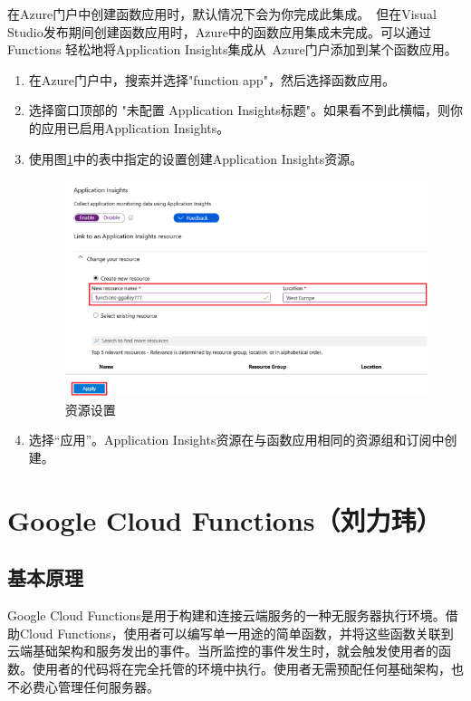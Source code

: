 \documentclass[11pt]{article}
\begin{document}
在Azure门户中创建函数应用时，默认情况下会为你完成此集成。 但在Visual Studio发布期间创建函数应用时，Azure中的函数应用集成未完成。可以通过 Functions 轻松地将Application Insights集成从 Azure门户添加到某个函数应用。
\begin{enumerate}
	\item 在Azure门户中，搜索并选择"function app"，然后选择函数应用。
	\item 选择窗口顶部的 "未配置 Application Insights标题"。如果看不到此横幅，则你的应用已启用Application Insights。
	\item 使用图\ref{fig13}中的表中指定的设置创建Application Insights资源。
	\begin{figure}[h]	
		\centering
		\includegraphics[scale=0.6]{figs/13.png}        %
		\caption{资源设置}
		\label{fig13}	
	\end{figure}
	\item 选择“应用”。Application Insights资源在与函数应用相同的资源组和订阅中创建。
\end{enumerate}	

\section{Google Cloud Functions（刘力玮）}
\subsection{基本原理}
Google Cloud Functions是用于构建和连接云端服务的一种无服务器执行环境。借助Cloud Functions，使用者可以编写单一用途的简单函数，并将这些函数关联到云端基础架构和服务发出的事件。当所监控的事件发生时，就会触发使用者的函数。使用者的代码将在完全托管的环境中执行。使用者无需预配任何基础架构，也不必费心管理任何服务器。
\end{document}
